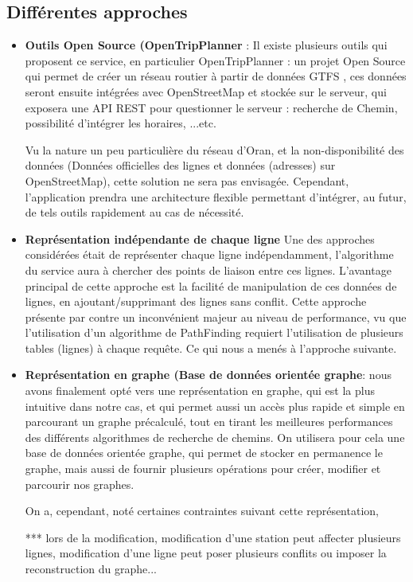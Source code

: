 \subsection{Différentes approches}
\begin{itemize}
	\item \textbf{Outils Open Source (OpenTripPlanner} : 
	      Il existe plusieurs outils qui proposent ce service, en particulier OpenTripPlanner : un projet Open Source qui permet de créer un réseau routier à partir de données GTFS , ces données seront ensuite intégrées avec OpenStreetMap et stockée sur le serveur, qui exposera une API REST pour questionner le serveur : recherche de Chemin, possibilité d'intégrer les horaires, ...etc.
	      		
	      Vu la nature un peu particulière du réseau d'Oran, et la non-disponibilité des données (Données officielles des lignes et données (adresses) sur OpenStreetMap), cette solution ne sera pas envisagée. 
	      Cependant, l'application prendra une architecture flexible permettant d'intégrer, au futur, de tels outils rapidement au cas de nécessité.
	\item \textbf{Représentation indépendante de chaque ligne}
	      Une des approches considérées était de représenter chaque ligne indépendamment, l'algorithme du service aura à chercher des points de liaison entre ces lignes.
	      L'avantage principal de cette approche est la facilité de manipulation de ces données de lignes, en ajoutant/supprimant des lignes sans conflit.
	      Cette approche présente par contre un inconvénient majeur au niveau de performance, vu que l'utilisation d'un algorithme de PathFinding requiert l'utilisation de plusieurs tables (lignes) à chaque requête. Ce qui nous a menés à l'approche suivante.
	\item \textbf{Représentation en graphe (Base de données orientée graphe}: nous avons finalement opté vers une représentation en graphe, qui est la plus intuitive dans notre cas, et qui permet aussi un accès plus rapide et simple en parcourant un graphe précalculé, tout en tirant les meilleures performances des différents algorithmes de recherche de chemins.
	On utilisera pour cela une base de données orientée graphe, qui permet de stocker en permanence le graphe, mais aussi de fournir plusieurs opérations pour créer, modifier et parcourir nos graphes.
	
	On a, cependant, noté certaines contraintes suivant cette représentation, 
	
	*** lors de la modification, modification d'une station peut affecter plusieurs lignes, modification d'une ligne peut poser plusieurs conflits ou imposer la reconstruction du graphe...
	     
\end{itemize}
